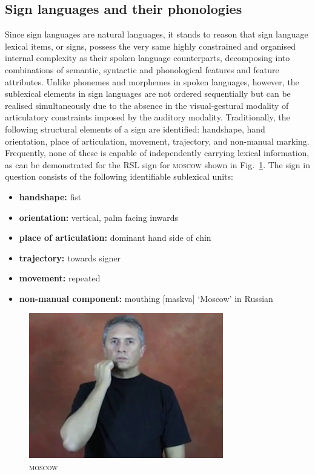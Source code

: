 \hypertarget{sec:sl-phonologies}{%
\subsection{Sign languages and their
phonologies}\label{sec:sl-phonologies}}

Since sign languages are natural languages, it stands to reason that
sign language lexical items, or signs, possess the very same highly
constrained and organised internal complexity as their spoken language
counterparts, decomposing into combinations of semantic, syntactic and
phonological features and feature attributes. Unlike phonemes and
morphemes in spoken languages, however, the sublexical elements in sign
languages are not ordered sequentially but can be realised
simultaneously due to the absence in the visual-gestural modality of
articulatory constraints imposed by the auditory modality.
Traditionally, the following structural elements of a sign are
identified: handshape, hand orientation, place of articulation,
movement, trajectory, and non-manual marking. Frequently, none of these
is capable of independently carrying lexical information, as can be
demonstrated for the RSL sign for \textsc{moscow} shown in
Fig.~\ref{fig:moskva}. The sign in question consists of the following
identifiable sublexical units:

\begin{itemize}
\tightlist
\item
  \textbf{handshape:} fist
\item
  \textbf{orientation:} vertical, palm facing inwards
\item
  \textbf{place of articulation:} dominant hand side of chin
\item
  \textbf{trajectory:} towards signer
\item
  \textbf{movement:} repeated
\item
  \textbf{non-manual component:} mouthing {[}maskva{]} `Moscow' in
  Russian
\end{itemize}

\begin{figure}
\hypertarget{fig:moskva}{%
\centering
\includegraphics{moskva-end.png}
\caption{\textsc{moscow}}\label{fig:moskva}
}
\end{figure}

